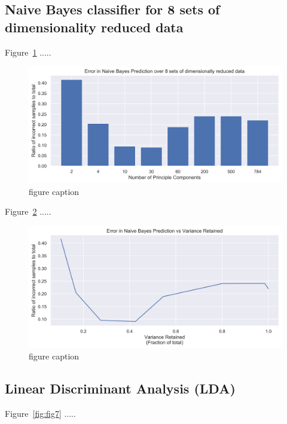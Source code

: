 \clearpage{}
\subsection{Naive Bayes classifier for 8 sets of dimensionality reduced data}

Figure~\ref{fig:fig5} .....
\begin{figure}[htb]
 \centering
\includegraphics[width=\textwidth]{assignment1/2-4-NBprediction_bar.png}
\caption{\label{fig:fig5}figure caption}
\end{figure}

Figure~\ref{fig:fig6} .....
\begin{figure}[htb]
 \centering
\includegraphics[width=\textwidth]{assignment1/2-4-NBprediction_line.png}
\caption{\label{fig:fig6}figure caption}
\end{figure}



\clearpage{}
\subsection{Linear Discriminant Analysis (LDA)}

Figure~\ref{fig:fig7} .....

